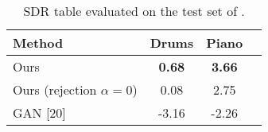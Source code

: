 \documentclass[a4paper]{article}
\begin{document}
\begin{table}[t!]
\setlength{\tabcolsep}{3pt}
\centering
{}
\caption{Ablation study for rejection parameter $\alpha$.} \label{table:rejection_ablation}
\end{table}
\begin{table}[t!]
\centering
\begin{tabular}{lccl}
\hline
\multicolumn{1}{|l|}{\textbf{Method}}       &  \multicolumn{1}{l}{\textbf{Drums}} & \multicolumn{1}{l|}{\textbf{Piano}}         \\ 
\hline
\multicolumn{1}{|l|}{Ours}            &  \textbf{0.68}            & \multicolumn{1}{c|}{\textbf{3.66}} \\ 
\hline
\multicolumn{1}{|l|}{Ours (rejection $\alpha=0$)} & 0.08                     & \multicolumn{1}{c|}{2.75}          \\ \hline
\multicolumn{1}{|l|}{GAN [20]}             & -3.16                     & \multicolumn{1}{c|}{-2.26}         \\ \hline
\end{tabular}
\caption{SDR table evaluated on the test set of \cite{narayanaswamy2020unsupervised}.}\label{table:gan}
\vspace{-0.9cm}
\end{table}
\end{document}
